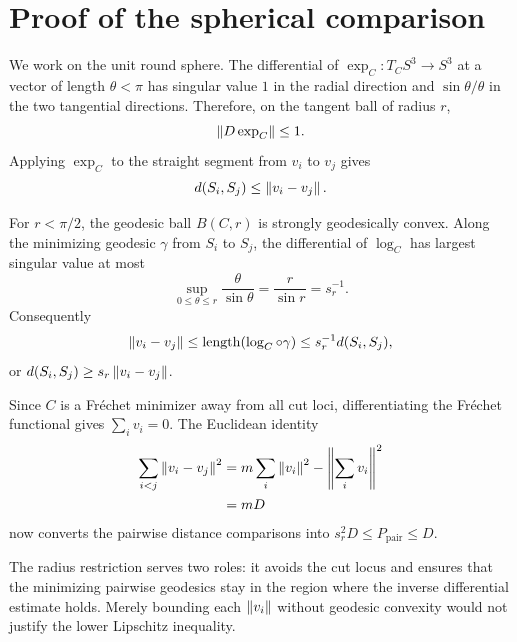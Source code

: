 \section{Proof of the spherical comparison}
\label{app:sphere}

We work on the unit round sphere.  The differential of
$\exp_C:T_C S^3\to S^3$ at a vector of length $\theta<\pi$ has singular value
$1$ in the radial direction and $\sin\theta/\theta$ in the two tangential
directions.  Therefore, on the tangent ball of radius $r$,
\[
 \left\lVert D\exp_C\right\rVert\le1.
\]
Applying $\exp_C$ to the straight segment from $v_i$ to $v_j$ gives
\[
 d(S_i,S_j)\le\left\lVert v_i-v_j\right\rVert.
\]

For $r<\pi/2$, the geodesic ball $B(C,r)$ is strongly geodesically convex.
Along the minimizing geodesic $\gamma$ from $S_i$ to $S_j$, the differential
of $\log_C$ has largest singular value at most
\[
 \sup_{0\le\theta\le r}\frac{\theta}{\sin\theta}
 =\frac{r}{\sin r}=s_r^{-1}.
\]
Consequently
\[
 \left\lVert v_i-v_j\right\rVert
 \le \operatorname{length}(\log_C\circ\gamma)
 \le s_r^{-1}d(S_i,S_j),
\]
or $d(S_i,S_j)\ge s_r\left\lVert v_i-v_j\right\rVert$.

Since $C$ is a Fr\'echet minimizer away from all cut loci, differentiating the
Fr\'echet functional gives $\sum_i v_i=0$.  The Euclidean identity
\begin{align*}
 \sum_{i<j}\left\lVert v_i-v_j\right\rVert^2
 &=m\sum_i\left\lVert v_i\right\rVert^2-\left\lVert\sum_i v_i\right\rVert^2\\
 &=mD
\end{align*}
now converts the pairwise distance comparisons into
$s_r^2D\le P_{\mathrm{pair}}\le D$.

The radius restriction serves two roles: it avoids the cut locus and ensures
that the minimizing pairwise geodesics stay in the region where the inverse
differential estimate holds.  Merely bounding each $\left\lVert v_i\right\rVert$ without
geodesic convexity would not justify the lower Lipschitz inequality.
